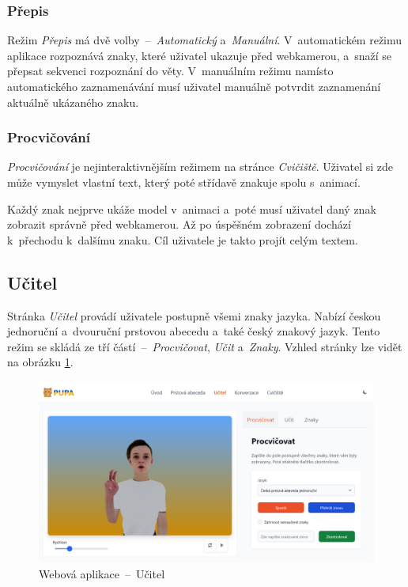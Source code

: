 \documentclass[
  master,
  program=ainfvs,
  biblatex,
  figures=true,
  tables=false,
  sourcecodes=true,
  glossaries,
  index
]{kidiplom}
\begin{document}
        \subsubsection{Přepis}
            Režim \emph{Přepis} má dvě volby~--~\emph{Automatický} a~\emph{Manuální}. V~automatickém režimu aplikace rozpoznává znaky, které uživatel ukazuje před webkamerou, a~snaží se přepsat sekvenci rozpoznání do věty. V~manuálním režimu namísto automatického zaznamenávání musí uživatel manuálně potvrdit zaznamenání aktuálně ukázaného znaku.
        
        \subsubsection{Procvičování}
            \emph{Procvičování} je nejinteraktivnějším režimem na stránce \emph{Cvičiště}. Uživatel si zde může vymyslet vlastní text, který poté střídavě znakuje spolu s~animací. 
            
            Každý znak nejprve ukáže model v~animaci a~poté musí uživatel daný znak zobrazit správně před webkamerou. Až po úspěšném zobrazení dochází k~přechodu k~dalšímu znaku. Cíl uživatele je takto projít celým textem.
        
    \subsection{Učitel}
        Stránka \emph{Učitel} provádí uživatele postupně všemi znaky jazyka. Nabízí českou jednoruční a~dvouruční prstovou abecedu a~také český znakový jazyk. Tento režim se skládá ze tří částí~--~\emph{Procvičovat}, \emph{Učit} a~\emph{Znaky}. Vzhled stránky lze vidět na obrázku \ref{ucitel}.

         \begin{figure}[htbp]
                \centering
                \includegraphics[width=1\columnwidth]{graphics/ucitel.png}
                \caption{Webová aplikace~--~Učitel}
                \label{ucitel}
            \end{figure}
\end{document}
